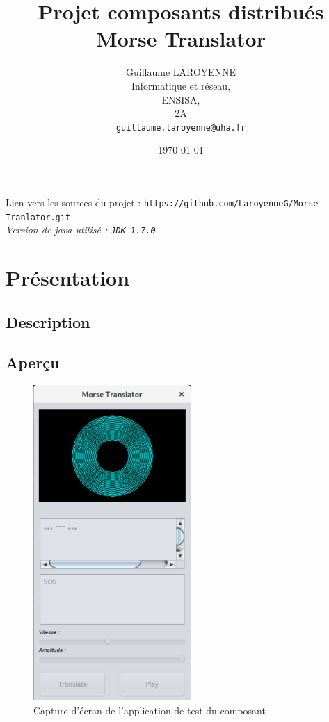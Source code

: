 \documentclass[a4paper,11pt]{article}
\title{\LARGE{Projet composants distribués}\\\bigskip \textbf{Morse Translator}}
\author{Guillaume LAROYENNE\\
   Informatique et réseau,\\
   ENSISA,\\
   2A\\
   \bigskip
   \texttt{guillaume.laroyenne@uha.fr}
   }
\date{\today}
\begin{document}
  \maketitle
  \begin{center}
  \large{Lien vers les sources du projet :} \texttt{https://github.com/LaroyenneG/Morse-Tranlator.git}\\[2cm]
  \textit{Version de java utilisé : \texttt{JDK 1.7.0}}
  \end{center}

  
      
  \newpage

\tableofcontents

\newpage

	\section{Présentation}
	\subsection{Description}
	
	
    \subsection{Aperçu}
    \begin{figure}[H]
    	\begin{center}
    		\includegraphics[scale=0.9]{descpicture.png}
    		\caption{Capture d'écran de l'application de test du composant}
    		\label{Capture d'écran de l'application de test du composant}
    	\end{center}
    \end{figure}
    
\end{document}
